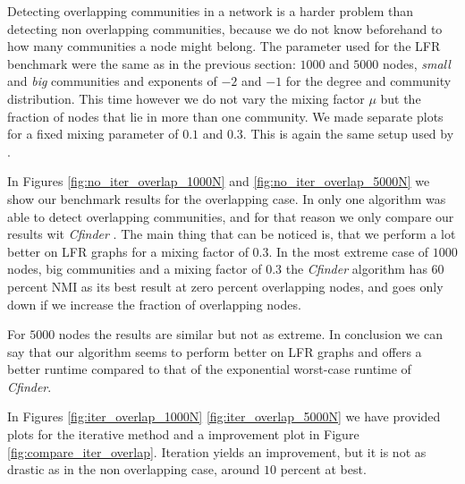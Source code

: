 Detecting overlapping communities in a network is a harder problem than detecting non overlapping communities, because we do not know beforehand to how many communities a node might belong. The parameter used for the LFR benchmark were the same as in the previous section: $1000$ and $5000$ nodes, \textit{small} and \textit{big} communities and exponents of $-2$ and $-1$ for the degree and community distribution. This time however we do not vary the mixing factor $\mu$ but the fraction of nodes that lie in more than one community. We made separate plots for a fixed mixing parameter of $0.1$ and $0.3$. This is again the same setup used by \cite{LF09}.

In Figures \ref{fig:no_iter_overlap_1000N} and \ref{fig:no_iter_overlap_5000N} we show our benchmark results for the overlapping case. In \cite{LF09} only one algorithm was able to detect overlapping communities, and for that reason we only compare our results wit \textit{Cfinder} \cite{PDFV05}. The main thing that can be noticed is, that we perform a lot better on LFR graphs for a mixing factor of $0.3$. In the most extreme case of $1000$ nodes, big communities and a mixing factor of $0.3$ the \textit{Cfinder} algorithm has $60$ percent NMI as its best result at zero percent overlapping nodes, and goes only down if we increase the fraction of overlapping nodes.

For $5000$ nodes the results are similar but not as extreme. In conclusion we can say that our algorithm seems to perform better on LFR graphs and offers a better runtime compared to that of the exponential worst-case runtime of \textit{Cfinder}.

In Figures \ref{fig:iter_overlap_1000N} \ref{fig:iter_overlap_5000N} we have provided plots for the iterative method and a improvement plot in Figure \ref{fig:compare_iter_overlap}. Iteration yields an improvement, but it is not as drastic as in the non overlapping case, around $10$ percent at best.